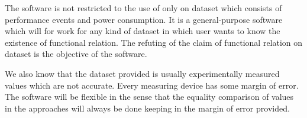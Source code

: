 The software is not restricted to the use of only on dataset which consists of performance events and power consumption. It is a general-purpose software which will for work for any kind of dataset in which user wants to know the existence of functional relation. The refuting of the claim of functional relation on dataset is the objective of the software.

We also know that the dataset provided is usually experimentally measured values which are not accurate. Every measuring device has some margin of error. The software will be flexible in the sense that the equality comparison of values in the approaches will always be done keeping in the margin of error provided.
